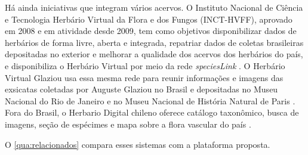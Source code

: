 \documentclass[
    12pt,        %
    openany,     %
    oneside,     %
    a4paper,     %
    english,     %
    french,      %
    spanish,     %
    brazil,      %
    article      %
]{abntex2}
\begin{document}
Há ainda iniciativas que integram vários acervos. O Instituto Nacional de Ciência e Tecnologia Herbário Virtual da Flora e dos Fungos (INCT-HVFF), aprovado em 2008 e em atividade desde 2009, tem como objetivos disponibilizar dados de herbários de forma livre, aberta e integrada, repatriar dados de coletas brasileiras depositadas no exterior e melhorar a qualidade dos acervos dos herbários do país, e disponibiliza o Herbário Virtual por meio da rede \textit{speciesLink} \cite{incthvff2026}. O Herbário Virtual Glaziou usa essa mesma rede para reunir informações e imagens das exsicatas coletadas por Auguste Glaziou no Brasil e depositadas no Museu Nacional do Rio de Janeiro e no Museu Nacional de História Natural de Paris \cite{glaziou2026}. Fora do Brasil, o Herbario Digital chileno oferece catálogo taxonômico, busca de imagens, seção de espécimes e mapa sobre a flora vascular do país \cite{herbariodigital2026}.

O \autoref{qua:relacionados} compara esses sistemas com a plataforma proposta.
\end{document}
